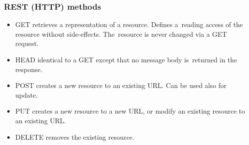 \documentclass[10pt,xcolor=pdflatex]{beamer}
\begin{document}
\begin{frame}[containsverbatim]\frametitle{REST (HTTP) methods}
\begin{itemize}
	\item GET retrieves a representation of a resource. Defines a~reading access of the resource without side-effects. The~resource is never changed via a GET request.
    \item HEAD identical to a GET except that no message body is~returned in the response.
    \item POST creates a new resource to an existing URL. Can be used also for update.
    \item PUT creates a new resource to a new URL, or modify an existing resource to an existing URL.
	\item DELETE removes the existing resource.
\end{itemize}
\end{frame}
\end{document}
